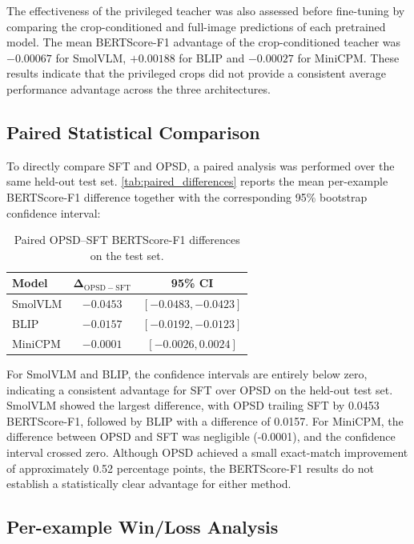 The effectiveness of the privileged teacher was also assessed before fine-tuning by comparing
the crop-conditioned and full-image predictions of each pretrained model. The mean BERTScore-F1
advantage of the crop-conditioned teacher was $-0.00067$ for SmolVLM, $+0.00188$ for BLIP
and $-0.00027$ for MiniCPM. These results indicate that the privileged crops did not
provide a consistent average performance advantage across the three architectures.

\subsection{Paired Statistical Comparison}

To directly compare SFT and OPSD, a paired analysis was performed over the same held-out test
set. \autoref{tab:paired_differences} reports the mean per-example BERTScore-F1 difference together with
the corresponding 95\% bootstrap confidence interval:

\begin{table}[h!]
\centering
\caption{Paired OPSD--SFT BERTScore-F1 differences on the test set.}
\label{tab:paired_differences}
\begin{tabular}{lcc}
\hline
\textbf{Model} &
$\boldsymbol{\Delta_{\mathrm{OPSD-SFT}}}$ &
\textbf{95\% CI} \\
\hline

SmolVLM &
$-0.0453$ &
$[-0.0483, -0.0423]$ \\

BLIP &
$-0.0157$ &
$[-0.0192, -0.0123]$ \\

MiniCPM &
$-0.0001$ &
$[-0.0026, 0.0024]$ \\

\hline
\end{tabular}
\end{table}

For SmolVLM and BLIP, the confidence intervals are entirely below zero, indicating a 
consistent advantage for SFT over OPSD on the held-out test set. SmolVLM showed the 
largest difference, with OPSD trailing SFT by 0.0453 BERTScore-F1, followed by BLIP 
with a difference of 0.0157. For MiniCPM, the difference between OPSD and SFT was 
negligible (-0.0001), and the confidence interval crossed zero. Although OPSD achieved a small
exact-match improvement of approximately 0.52 percentage points, the BERTScore-F1 results do not
establish a statistically clear advantage for either method.

\subsection{Per-example Win/Loss Analysis}

